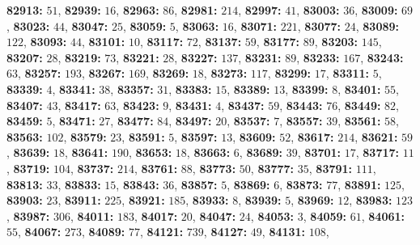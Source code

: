 \textsf{\bfseries 82913:} $51$, \textsf{\bfseries 82939:} $16$, \textsf{\bfseries 82963:} $86$, \textsf{\bfseries 82981:} $214$, \textsf{\bfseries 82997:} $41$, \textsf{\bfseries 83003:} $36$, \textsf{\bfseries 83009:} $69$, \textsf{\bfseries 83023:} $44$, \textsf{\bfseries 83047:} $25$, \textsf{\bfseries 83059:} $5$, \textsf{\bfseries 83063:} $16$, \textsf{\bfseries 83071:} $221$, \textsf{\bfseries 83077:} $24$, \textsf{\bfseries 83089:} $122$, \textsf{\bfseries 83093:} $44$, \textsf{\bfseries 83101:} $10$, \textsf{\bfseries 83117:} $72$, \textsf{\bfseries 83137:} $59$, \textsf{\bfseries 83177:} $89$, \textsf{\bfseries 83203:} $145$, \textsf{\bfseries 83207:} $28$, \textsf{\bfseries 83219:} $73$, \textsf{\bfseries 83221:} $28$, \textsf{\bfseries 83227:} $137$, \textsf{\bfseries 83231:} $89$, \textsf{\bfseries 83233:} $167$, \textsf{\bfseries 83243:} $63$, \textsf{\bfseries 83257:} $193$, \textsf{\bfseries 83267:} $169$, \textsf{\bfseries 83269:} $18$, \textsf{\bfseries 83273:} $117$, \textsf{\bfseries 83299:} $17$, \textsf{\bfseries 83311:} $5$, \textsf{\bfseries 83339:} $4$, \textsf{\bfseries 83341:} $38$, \textsf{\bfseries 83357:} $31$, \textsf{\bfseries 83383:} $15$, \textsf{\bfseries 83389:} $13$, \textsf{\bfseries 83399:} $8$, \textsf{\bfseries 83401:} $55$, \textsf{\bfseries 83407:} $43$, \textsf{\bfseries 83417:} $63$, \textsf{\bfseries 83423:} $9$, \textsf{\bfseries 83431:} $4$, \textsf{\bfseries 83437:} $59$, \textsf{\bfseries 83443:} $76$, \textsf{\bfseries 83449:} $82$, \textsf{\bfseries 83459:} $5$, \textsf{\bfseries 83471:} $27$, \textsf{\bfseries 83477:} $84$, \textsf{\bfseries 83497:} $20$, \textsf{\bfseries 83537:} $7$, \textsf{\bfseries 83557:} $39$, \textsf{\bfseries 83561:} $58$, \textsf{\bfseries 83563:} $102$, \textsf{\bfseries 83579:} $23$, \textsf{\bfseries 83591:} $5$, \textsf{\bfseries 83597:} $13$, \textsf{\bfseries 83609:} $52$, \textsf{\bfseries 83617:} $214$, \textsf{\bfseries 83621:} $59$, \textsf{\bfseries 83639:} $18$, \textsf{\bfseries 83641:} $190$, \textsf{\bfseries 83653:} $18$, \textsf{\bfseries 83663:} $6$, \textsf{\bfseries 83689:} $39$, \textsf{\bfseries 83701:} $17$, \textsf{\bfseries 83717:} $11$, \textsf{\bfseries 83719:} $104$, \textsf{\bfseries 83737:} $214$, \textsf{\bfseries 83761:} $88$, \textsf{\bfseries 83773:} $50$, \textsf{\bfseries 83777:} $35$, \textsf{\bfseries 83791:} $111$, \textsf{\bfseries 83813:} $33$, \textsf{\bfseries 83833:} $15$, \textsf{\bfseries 83843:} $36$, \textsf{\bfseries 83857:} $5$, \textsf{\bfseries 83869:} $6$, \textsf{\bfseries 83873:} $77$, \textsf{\bfseries 83891:} $125$, \textsf{\bfseries 83903:} $23$, \textsf{\bfseries 83911:} $225$, \textsf{\bfseries 83921:} $185$, \textsf{\bfseries 83933:} $8$, \textsf{\bfseries 83939:} $5$, \textsf{\bfseries 83969:} $12$, \textsf{\bfseries 83983:} $123$, \textsf{\bfseries 83987:} $306$, \textsf{\bfseries 84011:} $183$, \textsf{\bfseries 84017:} $20$, \textsf{\bfseries 84047:} $24$, \textsf{\bfseries 84053:} $3$, \textsf{\bfseries 84059:} $61$, \textsf{\bfseries 84061:} $55$, \textsf{\bfseries 84067:} $273$, \textsf{\bfseries 84089:} $77$, \textsf{\bfseries 84121:} $739$, \textsf{\bfseries 84127:} $49$, \textsf{\bfseries 84131:} $108$, 
